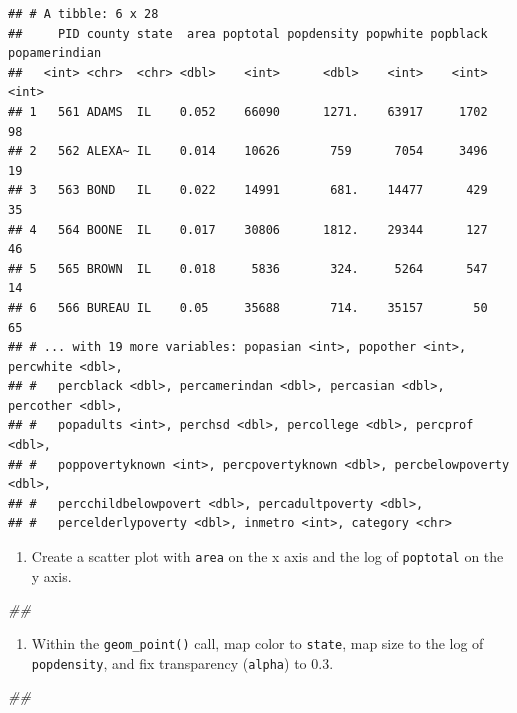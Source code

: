 \documentclass[]{book}
\newenvironment{Shaded}{\begin{snugshade}}{\end{snugshade}}
\newcommand{\CommentTok}[1]{\textcolor[rgb]{0.56,0.35,0.01}{\textit{#1}}}
\providecommand{\tightlist}{%
  \setlength{\itemsep}{0pt}\setlength{\parskip}{0pt}}
\begin{document}
\begin{verbatim}
## # A tibble: 6 x 28
##     PID county state  area poptotal popdensity popwhite popblack popamerindian
##   <int> <chr>  <chr> <dbl>    <int>      <dbl>    <int>    <int>         <int>
## 1   561 ADAMS  IL    0.052    66090      1271.    63917     1702            98
## 2   562 ALEXA~ IL    0.014    10626       759      7054     3496            19
## 3   563 BOND   IL    0.022    14991       681.    14477      429            35
## 4   564 BOONE  IL    0.017    30806      1812.    29344      127            46
## 5   565 BROWN  IL    0.018     5836       324.     5264      547            14
## 6   566 BUREAU IL    0.05     35688       714.    35157       50            65
## # ... with 19 more variables: popasian <int>, popother <int>, percwhite <dbl>,
## #   percblack <dbl>, percamerindan <dbl>, percasian <dbl>, percother <dbl>,
## #   popadults <int>, perchsd <dbl>, percollege <dbl>, percprof <dbl>,
## #   poppovertyknown <int>, percpovertyknown <dbl>, percbelowpoverty <dbl>,
## #   percchildbelowpovert <dbl>, percadultpoverty <dbl>,
## #   percelderlypoverty <dbl>, inmetro <int>, category <chr>
\end{verbatim}

\begin{enumerate}
\def\labelenumi{\arabic{enumi}.}
\tightlist
\item
  Create a scatter plot with \texttt{area} on the x axis and the log of \texttt{poptotal} on the y axis.
\end{enumerate}

\begin{Shaded}
\begin{Highlighting}[]
\CommentTok{## }
\end{Highlighting}
\end{Shaded}

\begin{enumerate}
\def\labelenumi{\arabic{enumi}.}
\setcounter{enumi}{1}
\tightlist
\item
  Within the \texttt{geom\_point()} call, map color to \texttt{state}, map size to the log of \texttt{popdensity}, and fix transparency (\texttt{alpha}) to 0.3.
\end{enumerate}

\begin{Shaded}
\begin{Highlighting}[]
\CommentTok{## }
\end{Highlighting}
\end{Shaded}
\end{document}

